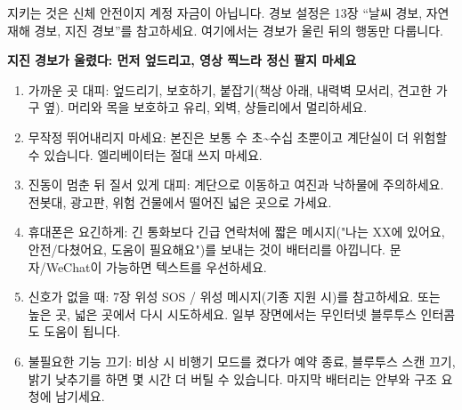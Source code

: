 


지키는 것은 신체 안전이지 계정 자금이 아닙니다. 경보 설정은 13장 “날씨 경보, 자연재해 경보, 지진 경보”를 참고하세요. 여기에서는 경보가 울린 뒤의 행동만 다룹니다.

\textbf{지진 경보가 울렸다: 먼저 엎드리고, 영상 찍느라 정신 팔지 마세요}\par

\begin{enumerate}
  \item 가까운 곳 대피: 엎드리기, 보호하기, 붙잡기(책상 아래, 내력벽 모서리, 견고한 가구 옆). 머리와 목을 보호하고 유리, 외벽, 샹들리에서 멀리하세요.
  \item 무작정 뛰어내리지 마세요: 본진은 보통 수 초\textasciitilde{}수십 초뿐이고 계단실이 더 위험할 수 있습니다. 엘리베이터는 절대 쓰지 마세요.
  \item 진동이 멈춘 뒤 질서 있게 대피: 계단으로 이동하고 여진과 낙하물에 주의하세요. 전봇대, 광고판, 위험 건물에서 떨어진 넓은 곳으로 가세요.
  \item 휴대폰은 요긴하게: 긴 통화보다 긴급 연락처에 짧은 메시지("나는 XX에 있어요, 안전/다쳤어요, 도움이 필요해요")를 보내는 것이 배터리를 아낍니다. 문자/WeChat이 가능하면 텍스트를 우선하세요.
  \item 신호가 없을 때: 7장 위성 SOS / 위성 메시지(기종 지원 시)를 참고하세요. 또는 높은 곳, 넓은 곳에서 다시 시도하세요. 일부 장면에서는 무인터넷 블루투스 인터콤도 도움이 됩니다.
  \item 불필요한 기능 끄기: 비상 시 비행기 모드를 켰다가 예약 종료, 블루투스 스캔 끄기, 밝기 낮추기를 하면 몇 시간 더 버틸 수 있습니다. 마지막 배터리는 안부와 구조 요청에 남기세요.
\end{enumerate}

